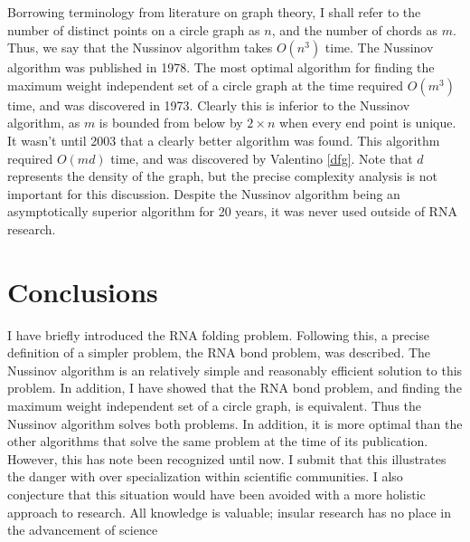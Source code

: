 \documentclass[12pt, a4paper]{article}
\begin{document}
Borrowing terminology from literature on graph theory, I shall refer to the number of distinct points on a circle graph as $n$, and the number of chords as $m$. Thus, we say that the Nussinov algorithm takes $O(n^3)$ time. The Nussinov algorithm was published in 1978. The most optimal algorithm for finding the maximum weight independent set of a circle graph at the time required $O(m^3)$ time, and was discovered in 1973. Clearly this is inferior to the Nussinov algorithm, as $m$ is bounded from below by $2 \times n$ when every end point is unique. It wasn't until 2003 that a clearly better algorithm was found. This algorithm required $O(md)$ time, and was discovered by Valentino \ref{dfg}. Note that $d$ represents the density of the graph, but the precise complexity analysis is not important for this discussion. Despite the Nussinov algorithm being an asymptotically superior algorithm for 20 years, it was never used outside of RNA research.


\section{Conclusions}
I have briefly introduced the RNA folding problem. Following this, a precise definition of a simpler problem, the RNA bond problem, was described. The Nussinov algorithm is an relatively simple and reasonably efficient solution to this problem. In addition, I have showed that the RNA bond problem, and finding the maximum weight independent set of a circle graph, is equivalent. Thus the Nussinov algorithm solves both problems. In addition, it is more optimal than the other algorithms that solve the same problem at the time of its publication. However, this has note been recognized until now. I submit that this illustrates the danger with over specialization within scientific communities. I also conjecture that this situation would have been avoided with a more holistic approach to research. All
knowledge is valuable; insular research has no place in the advancement of science




\end{document}
